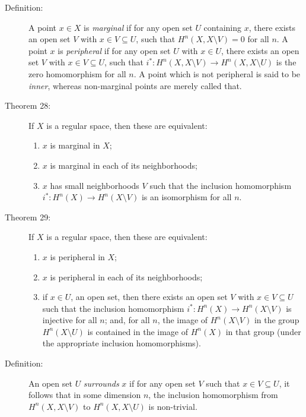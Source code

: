 \documentclass{article}
\begin{document}
\begin{description}

\item[Definition:] A point $x \in X$ is \emph{marginal} if for any open set $U$ containing $x$, there exists an open set $V$ with $x \in V \subseteq U$, such that $H^n(X, X \setminus V) = 0$ for all $n$. A point $x$ is \emph{peripheral} if for any open set $U$ with $x \in U$, there exists an open set $V$ with $x \in V \subseteq U$, such that $i^*: H^n(X, X \setminus V) \longrightarrow H^n(X, X \setminus U)$ is the zero homomorphism for all $n$. A point which is not peripheral is said to be \emph{inner}, whereas non-marginal points are merely called that.

\item[Theorem 28:] If $X$ is a regular space, then these are equivalent:
\begin{enumerate}[\hspace{1cm}(1)]
  \item $x$ is marginal in $X$;
  \item $x$ is marginal in each of its neighborhoods;
  \item $x$ has small neighborhoods $V$ such that the inclusion homomorphism $i^*: H^n(X) \longrightarrow H^n(X \setminus V)$ is an isomorphism for all $n$.
\end{enumerate}

\item[Theorem 29:] If $X$ is a regular space, then these are equivalent:
\begin{enumerate}[\hspace{1cm}(1)]
  \item $x$ is peripheral in $X$;
  \item $x$ is peripheral in each of its neighborhoods;
  \item if $x \in U$, an open set, then there exists an open set $V$ with $x \in V \subseteq U$ such that the inclusion homomorphism $i^*: H^n (X) \longrightarrow H^n (X \setminus V)$ is injective for all $n$; and, for all $n$, the image of $H^n (X \setminus V)$ in the group $H^n (X \setminus U)$ is contained in the image of $H^n (X)$ in that group (under the appropriate inclusion homomorphisms).
\end{enumerate}

\item[Definition:] An open set $U$ \emph{surrounds} $x$ if for any open set $V$ such that $x \in V \subseteq U$, it follows that in some dimension $n$, the inclusion homomorphism from $H^n (X, X \setminus V)$ to $H^n (X, X \setminus U)$ is non-trivial.


\end{description}
\end{document}
